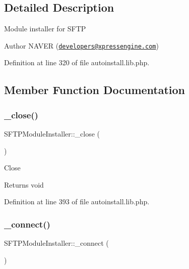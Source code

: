 \subsection{Detailed Description}
Module installer for S\+F\+TP \begin{DoxyAuthor}{Author}
N\+A\+V\+ER (\href{mailto:developers@xpressengine.com}{\tt developers@xpressengine.\+com}) 
\end{DoxyAuthor}


Definition at line 320 of file autoinstall.\+lib.\+php.



\subsection{Member Function Documentation}
\mbox{\label{classSFTPModuleInstaller_a6f2c54d7303968d97d1026a00ba0961a}} 
\subsubsection{\texorpdfstring{\+\_\+close()}{\_close()}}
{\footnotesize\ttfamily S\+F\+T\+P\+Module\+Installer\+::\+\_\+close (\begin{DoxyParamCaption}{ }\end{DoxyParamCaption})}

Close

\begin{DoxyReturn}{Returns}
void 
\end{DoxyReturn}


Definition at line 393 of file autoinstall.\+lib.\+php.

\mbox{\label{classSFTPModuleInstaller_a50b67d17519fb8e86aa5c44031daa63f}} 
\subsubsection{\texorpdfstring{\+\_\+connect()}{\_connect()}}
{\footnotesize\ttfamily S\+F\+T\+P\+Module\+Installer\+::\+\_\+connect (\begin{DoxyParamCaption}{ }\end{DoxyParamCaption})}

